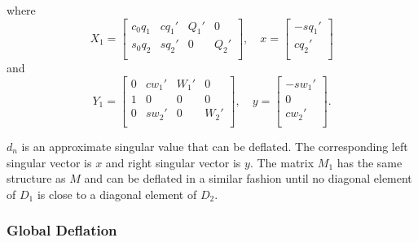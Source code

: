 \documentclass[12pt]{article}
\begin{document}
where
\[
    X_1 = \begin{bmatrix}
        c_0 q_1 & c q_1' & Q_1' & 0 \\
        s_0 q_2 & s q_2' & 0 & Q_2' \\
    \end{bmatrix}, \quad
    x = \begin{bmatrix}
        -s q_1' \\
        c q_2' \\
    \end{bmatrix}
\]
and
\[
    Y_1 = \begin{bmatrix}
        0 & c w_1' & W_1' & 0 \\
        1 & 0 & 0 & 0 \\
        0 & s w_2' & 0 & W_2' \\
    \end{bmatrix}, \quad y = \begin{bmatrix}
        -s w_1' \\
        0 \\
        c w_2' \\
    \end{bmatrix}.
\]

\(d_n\) is an approximate singular value that can be deflated. The corresponding left singular vector is \(x\) and right singular vector is \(y\). The matrix \(M_1\) has the same structure as \(M\) and can be deflated in a similar fashion until no diagonal element of \(D_1\) is close to a diagonal element of \(D_2\).

\subsubsection{Global Deflation}
\end{document}
